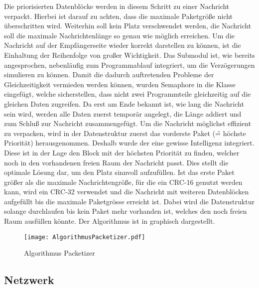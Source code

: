 Die priorisierten Datenbl{\"o}cke werden in diesem Schritt zu einer Nachricht
verpackt. Hierbei ist darauf zu achten, dass die maximale Paketgr{\"o}{\ss}e
nicht {\"u}berschritten wird. Weiterhin soll kein Platz verschwendet werden,
\dahe die Nachricht soll die maximale Nachrichtenl{\"a}nge so genau wie
m{\"o}glich erreichen.
Um die Nachricht auf der Empf{\"a}ngerseite wieder korrekt darstellen zu k{\"o}nnen, ist
die Einhaltung der Reihenfolge von gro{\ss}er Wichtigkeit. \newline
Das Submodul ist, wie bereits angesprochen, nebenl{\"a}ufig zum Programmablauf
integriert, um die Verz{\"o}gerungen simulieren zu k{\"o}nnen. Damit die
dadurch auftretenden Probleme der Gleichzeitigkeit vermieden werden k{\"o}nnen,
wurden Semaphore in die Klasse 
eingef{\"u}gt, welche sicherstellen, dass nicht zwei Programmteile gleichzeitig auf
die gleichen Daten zugreifen. Da erst am Ende bekannt ist, wie lang die
Nachricht sein wird, werden alle Daten zuerst tempor{\"a}r angelegt, die
L{\"a}nge addiert und zum Schlu{\ss} zur Nachricht zusammengef{\"u}gt.
Um die Nachricht m{\"o}glichst effizient zu verpacken, wird in der
Datenstruktur  zuerst das vorderste Paket
(\^= h{\"o}chste Priorit{\"a}t) herausgenommen. Deshalb wurde der
 eine gewisse Intelligenz integriert.
Diese ist in der Lage den Block mit der h{\"o}chsten Priorit{\"a}t zu finden, welcher
noch in den vorhandenen freien Raum der Nachricht passt. Dies stellt die
optimale L{\"o}sung dar, um den Platz sinnvoll aufzuf{\"u}llen. \newline 
Ist das erste Paket gr{\"o}{\ss}er als die maximale Nachrichtengr{\"o}{\ss}e,
f{\"u}r die ein CRC-16 genutzt werden kann, wird ein CRC-32 verwendet und die Nachricht mit weiteren
Datenbl{\"o}cken aufgef{\"u}llt bis die maximale Paketgr{\"o}sse erreicht ist. Dabei wird
die Datenstruktur  solange
durchlaufen bis kein Paket mehr vorhanden ist, welches den noch freien Raum
ausf{\"u}llen k{\"o}nnte. \newline 
Der Algorithmus ist in  graphisch dargestellt.

\begin{figure}[H]
\centering
\texttt{[image: AlgorithmusPacketizer.pdf]}
\caption{Algorithmus Packetizer}
\label{fig:AlgorithmusPacketizer}
\end{figure}

\subsection{Netzwerk}


